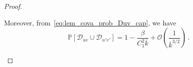 \documentclass[journal]{IEEEtran}
\newcommand{\Cov}{\mathrm{Cov}}
\theoremstyle{definition}
\theoremstyle{definition}
\newcommand{\Dc}{\mathcal{D}}
\newcommand{\Ec}{\mathcal{E}}
\newcommand{\PP}{\mathbb{P}}
\newcommand{\rE}{\mathrm{E}}
\newcommand{\kb}{\overline{k}}
\newcommand{\bigO}{\mathcal{O}}
\begin{document}
\begin{proof}
\begin{enumerate}
		Moreover, from~\eqref{eq:lem_cova_prob_Duv_cap}, we have  %
		\begin{equation} \label{eq:lem_cova_D_uv_cup}
		    \PP[\Dc_{uv} \cup \Dc_{u'v'}] = 1 - \frac{\beta}{C_1^2 \kb} + \bigO\left( \frac{1}{\kb^{3/2}} \right) \,.
		\end{equation}

\end{enumerate}
\end{proof}
\end{document}
